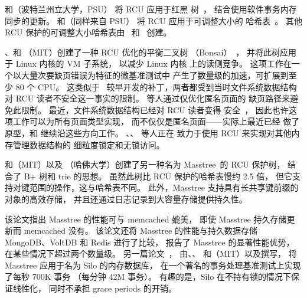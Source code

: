 和（波特兰州立大学，PSU）
将 RCU 应用于红黑
树~\cite{PhilHowardPhD,PhilHoward2011RCUTMRBTree}，
结合使用软件事务内存同步的更新。
和（同样来自 PSU）
将 RCU 应用于可调整大小的
哈希表~\cite{JoshTriplettPhD,Triplett:2011:RPHash,JonCorbet2014RCUhash1,JonCorbet2014RCUhash2}。
其他 RCU 保护的可调整大小哈希表由
~\cite{HerbertXu2010RCUResizeHash}和
~\cite{PaulMcKenney2013LWNURCUhash}创建。

、和
（MIT）创建了一种 RCU 优化的平衡二叉树
（Bonsai）~\cite{AustinClements2012RCULinux:mmapsem}，
并将此树应用于 Linux 内核的 VM 子系统，
以减少 Linux 内核  上的读侧竞争。
这项工作在一个以大量次要缺页错误为特征的微基准测试中
产生了数量级的加速，可扩展到至少 80 个 CPU。
这类似于~\cite{PeterZijlstra2014SpeculativePageFault}
较早开发的补丁，两者都受到当时文件系统数据结构
对 RCU 读者不安全这一事实的限制。
等人通过仅优化匿名页面的
缺页路径来避免此限制。
最近，文件系统数据结构已经对 RCU 读者变得
安全~\cite{JonathanCorbet2010dcacheRCU,JonathanCorbet2011dcacheRCUbug}，
因此也许这项工作可以为所有页面类型实现，
而不仅仅是匿名页面——实际上最近已经
做了原型，和
继续沿这些方向工作。
、、
等人正在
致力于使用 RCU 来实现对其他内存管理数据结构的
细粒度锁定和无锁访问。

和（MIT）以及
（哈佛大学）创建了另一种名为
Masstree~\cite{Mao:2012:CCF:2168836.2168855}的 RCU 保护树，
结合了 B+ 树和 trie 的思想。
虽然此树比 RCU 保护的哈希表慢约 2.5 倍，
但它支持对键范围的操作，这与哈希表不同。
此外，Masstree 支持具有长共享键前缀的对象的高效存储，
并且还通过日志记录到大容量存储提供持久性。

该论文指出 Masstree 的性能可与 memcached 媲美，
即使 Masstree 持久存储更新而 memcached 没有。
该论文还将 Masstree 的性能与持久数据存储
MongoDB、VoltDB 和 Redis 进行了比较，
报告了 Masstree 的显著性能优势，
在某些情况下超过两个数量级。
另一篇论文~\cite{Tu:2013:STM:2517349.2522713}，
由、、
和（MIT）以及撰写，
将 Masstree 应用于名为 Silo 的内存数据库，
在一个著名的事务处理基准测试上实现了每秒 700K 事务
（每分钟 42M 事务）。
有趣的是，Silo 在不持有锁的情况下保证线性化，
同时不承担 grace periods 的开销。

